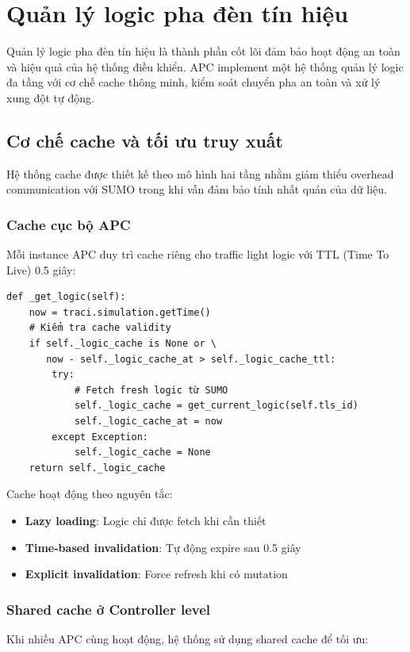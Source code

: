 \documentclass[12pt,a4paper,oneside]{report}
\begin{document}
\section{Quản lý logic pha đèn tín hiệu}

Quản lý logic pha đèn tín hiệu là thành phần cốt lõi đảm bảo hoạt động an toàn và hiệu quả của hệ thống điều khiển. APC implement một hệ thống quản lý logic đa tầng với cơ chế cache thông minh, kiểm soát chuyển pha an toàn và xử lý xung đột tự động.

\subsection{Cơ chế cache và tối ưu truy xuất}

Hệ thống cache được thiết kế theo mô hình hai tầng nhằm giảm thiểu overhead communication với SUMO trong khi vẫn đảm bảo tính nhất quán của dữ liệu.

\subsubsection{Cache cục bộ APC}

Mỗi instance APC duy trì cache riêng cho traffic light logic với TTL (Time To Live) 0.5 giây:

\begin{lstlisting}[style=py, caption={Implementation của logic cache cục bộ}]
def _get_logic(self):
    now = traci.simulation.getTime()
    # Kiểm tra cache validity
    if self._logic_cache is None or \
       now - self._logic_cache_at > self._logic_cache_ttl:
        try:
            # Fetch fresh logic từ SUMO
            self._logic_cache = get_current_logic(self.tls_id)
            self._logic_cache_at = now
        except Exception:
            self._logic_cache = None
    return self._logic_cache
\end{lstlisting}

Cache hoạt động theo nguyên tắc:
\begin{itemize}
    \item \textbf{Lazy loading}: Logic chỉ được fetch khi cần thiết
    \item \textbf{Time-based invalidation}: Tự động expire sau 0.5 giây
    \item \textbf{Explicit invalidation}: Force refresh khi có mutation
\end{itemize}
\vspace{3cm}
\subsubsection{Shared cache ở Controller level}
Khi nhiều APC cùng hoạt động, hệ thống sử dụng shared cache để tối ưu:
\end{document}
